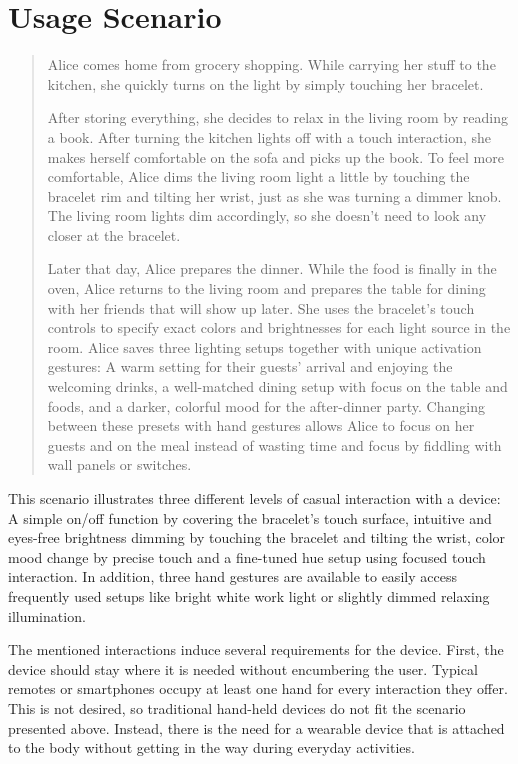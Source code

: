 \chapter{Usage Scenario}

\begin{quotation}
Alice comes home from grocery shopping. While carrying her stuff to the kitchen, she quickly turns on the light by simply touching her bracelet.

After storing everything, she decides to relax in the living room by reading a book. After turning the kitchen lights off with a touch interaction, she makes herself comfortable on the sofa and picks up the book. To feel more comfortable, Alice dims the living room light a little by touching the bracelet rim and tilting her wrist, just as she was turning a dimmer knob. The living room lights dim accordingly, so she doesn't need to look any closer at the bracelet.

Later that day, Alice prepares the dinner. While the food is finally in the oven, Alice returns to the living room and prepares the table for dining with her friends that will show up later. She uses the bracelet's touch controls to specify exact colors and brightnesses for each light source in the room. Alice saves three lighting setups together with unique activation gestures: A warm setting for their guests' arrival and enjoying the welcoming drinks, a well-matched dining setup with focus on the table and foods, and a darker, colorful mood for the after-dinner party. Changing between these presets with hand gestures allows Alice to focus on her guests and on the meal instead of wasting time and focus by fiddling with wall panels or switches.
\end{quotation}

This scenario illustrates three different levels of casual interaction with a device: A simple on/off function by covering the bracelet's touch surface, intuitive and eyes-free brightness dimming by touching the bracelet and tilting the wrist, color mood change by precise touch and a fine-tuned hue setup using focused touch interaction. In addition, three hand gestures are available to easily access frequently used setups like bright white work light or slightly dimmed relaxing illumination.

The mentioned interactions induce several requirements for the device. First, the device should stay where it is needed without encumbering the user. Typical remotes or smartphones occupy at least one hand for every interaction they offer. This is not desired, so traditional hand-held devices do not fit the scenario presented above. Instead, there is the need for a wearable device that is attached to the body without getting in the way during everyday activities.

